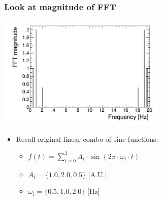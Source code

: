 \documentclass[bigger]{beamer}
\begin{document}
\begin{frame}
\frametitle{Look at magnitude of FFT}
\label{sec-2-1-2}
\label{sec-2-1-2-1}

\centering
\includegraphics[width=0.6\textwidth]{fig/tutorial_FFT_magnitude.png}
\begin{itemize}

\item Recall original linear combo of sine functions:
\label{sec-2-1-2-2}%
\begin{itemize}

\item \(f(t) = \sum_{i = 0}^3 A_{i} \cdot \sin (2\pi \cdot \omega_{i} \cdot t)\)
\label{sec-2-1-2-2-1}%

\item \(A_{i} = \{1.0, 2.0, 0.5\}\) [A.U.]
\label{sec-2-1-2-2-2}%

\item \(\omega_{i} = \{0.5, 1.0, 2.0\}\) [Hz]
\label{sec-2-1-2-2-3}%
\end{itemize} %
\end{itemize} %
\end{frame}
\end{document}
